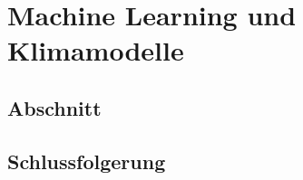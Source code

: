 %
%
%
\chapter{Machine Learning und Klimamodelle\label{chapter:learning}}
\begin{refsection}

\section{Abschnitt}

\section{Schlussfolgerung}




\printbibliography[heading=subbibliography]
\end{refsection}
